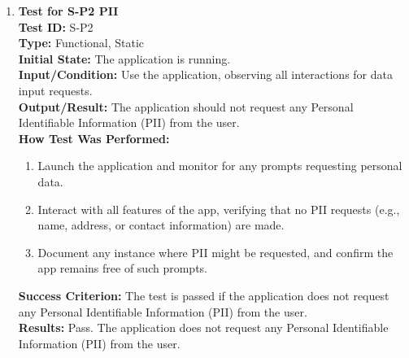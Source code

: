 \documentclass[12pt, titlepage]{article}
\begin{document}
\begin{enumerate}
    \item \textbf{Test for S-P2 PII} \\
      \newline
      \textbf{Test ID:} S-P2 \\
      \textbf{Type:} Functional, Static \\
      \textbf{Initial State:} The application is running. \\
      \textbf{Input/Condition:} Use the application, observing all interactions for data input requests. \\
      \textbf{Output/Result:} The application should not request any Personal Identifiable Information (PII) from the user. \\
      \textbf{How Test Was Performed:}
      \begin{enumerate}
          \item Launch the application and monitor for any prompts requesting personal data.
          \item Interact with all features of the app, verifying that no PII requests (e.g., name, address, or contact 
          information) are made.
          \item Document any instance where PII might be requested, and confirm the app remains free of such prompts.
      \end{enumerate}
      \textbf{Success Criterion:} The test is passed if the application does not request any Personal Identifiable Information (PII) from the user.\\
      \textbf{Results:} Pass. The application does not request any Personal Identifiable Information (PII) from the user.\\


\end{enumerate}
\end{document}
